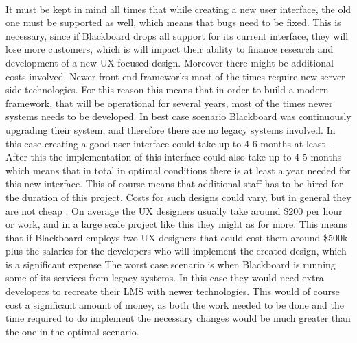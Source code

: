\documentclass[]{article}
\begin{document}
\paragraph{}
It must be kept in mind all times that while creating a new user interface, the old one must be supported as well, which means that bugs need to be fixed. This is necessary, since if Blackboard drops all support for its current interface, they will lose more customers, which is will impact their ability to finance research and development of a new UX focused design. Moreover there might be additional costs involved. Newer front-end frameworks most of the times require new server side technologies. For this reason this means that in order to build a modern framework, that will be operational for several years, most of the times newer systems needs to be developed. In best case scenario Blackboard was continuously upgrading their system, and therefore there are no legacy systems involved. In this case creating a good user interface could take up to 4-6 months at least \cite{UX-30000}. After this the implementation of this interface could also take up to 4-5 months \cite{Webredesign-adv} which means that in total in optimal conditions there is at least a year needed for this new interface. This of course means that additional staff has to be hired for the duration of this project. Costs for such designs could vary, but in general they are not cheap \cite{UX-cost}. On average the UX designers usually take around \$200 per hour or work, and in a large scale project like this they might as for more. This means that if Blackboard employs two UX designers that could cost them around \$500k plus the salaries for the developers who will implement the created design, which is a significant expense The worst case scenario is when Blackboard is running some of its services from legacy systems. In this case they would need extra developers to recreate their LMS with newer technologies. This would of course cost a significant amount of money, as both the work needed to be done and the time required to do implement the necessary changes would be much greater than the one in the optimal scenario.
\newpage



\printbibliography{}
\end{document}
